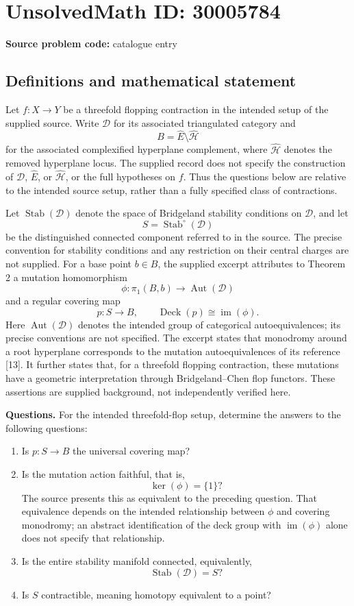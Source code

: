 \documentclass[11pt]{article}
\begin{document}
\section*{UnsolvedMath ID: 30005784}
\textbf{Source problem code:} catalogue entry
\subsection{Definitions and mathematical statement}
Let \(f\colon X\to Y\) be a threefold flopping contraction in the intended setup of the supplied source. Write \(\mathcal D\) for its associated triangulated category and
\[
B=\widehat E\setminus\widehat{\mathcal H}
\]
for the associated complexified hyperplane complement, where \(\widehat{\mathcal H}\) denotes the removed hyperplane locus. The supplied record does not specify the construction of \(\mathcal D\), \(\widehat E\), or \(\widehat{\mathcal H}\), or the full hypotheses on \(f\). Thus the questions below are relative to the intended source setup, rather than a fully specified class of contractions.

Let \(\operatorname{Stab}(\mathcal D)\) denote the space of Bridgeland stability conditions on \(\mathcal D\), and let
\[
S=\operatorname{Stab}^{\circ}(\mathcal D)
\]
be the distinguished connected component referred to in the source. The precise convention for stability conditions and any restriction on their central charges are not supplied. For a base point \(b\in B\), the supplied excerpt attributes to Theorem 2 a mutation homomorphism
\[
\phi\colon\pi_1(B,b)\longrightarrow\operatorname{Aut}(\mathcal D)
\]
and a regular covering map
\[
p\colon S\longrightarrow B,
\qquad \operatorname{Deck}(p)\cong\operatorname{im}(\phi).
\]
Here \(\operatorname{Aut}(\mathcal D)\) denotes the intended group of categorical autoequivalences; its precise conventions are not specified. The excerpt states that monodromy around a root hyperplane corresponds to the mutation autoequivalences of its reference [13]. It further states that, for a threefold flopping contraction, these mutations have a geometric interpretation through Bridgeland--Chen flop functors. These assertions are supplied background, not independently verified here.

\textbf{Questions.} For the intended threefold-flop setup, determine the answers to the following questions:
\begin{enumerate}
\item Is \(p\colon S\to B\) the universal covering map?
\item Is the mutation action faithful, that is,
\[
\ker(\phi)=\{1\}?
\]
The source presents this as equivalent to the preceding question. That equivalence depends on the intended relationship between \(\phi\) and covering monodromy; an abstract identification of the deck group with \(\operatorname{im}(\phi)\) alone does not specify that relationship.
\item Is the entire stability manifold connected, equivalently,
\[
\operatorname{Stab}(\mathcal D)=S?
\]
\item Is \(S\) contractible, meaning homotopy equivalent to a point?
\end{enumerate}
\end{document}
